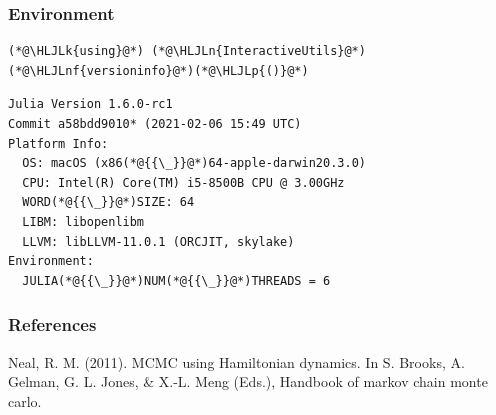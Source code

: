 \documentclass{beamer}
\newcommand{\HLJLk}[1]{\textcolor[RGB]{148,91,176}{\textbf{#1}}}
\newcommand{\HLJLn}[1]{#1}
\newcommand{\HLJLnf}[1]{\textcolor[RGB]{66,102,213}{#1}}
\newcommand{\HLJLp}[1]{#1}
\begin{document}
\begin{frame}[fragile]
\frametitle{Environment}


\begin{lstlisting}
(*@\HLJLk{using}@*) (*@\HLJLn{InteractiveUtils}@*)
(*@\HLJLnf{versioninfo}@*)(*@\HLJLp{()}@*)
\end{lstlisting}

\begin{lstlisting}
Julia Version 1.6.0-rc1
Commit a58bdd9010* (2021-02-06 15:49 UTC)
Platform Info:
  OS: macOS (x86(*@{{\_}}@*)64-apple-darwin20.3.0)
  CPU: Intel(R) Core(TM) i5-8500B CPU @ 3.00GHz
  WORD(*@{{\_}}@*)SIZE: 64
  LIBM: libopenlibm
  LLVM: libLLVM-11.0.1 (ORCJIT, skylake)
Environment:
  JULIA(*@{{\_}}@*)NUM(*@{{\_}}@*)THREADS = 6
\end{lstlisting}




\end{frame}


\begin{frame}[fragile]
\frametitle{References}

Neal, R. M. (2011). MCMC using Hamiltonian dynamics. In S. Brooks, A. Gelman, G. L. Jones, \& X.-L. Meng (Eds.), Handbook of markov chain monte carlo.



\end{frame}
\end{document}
